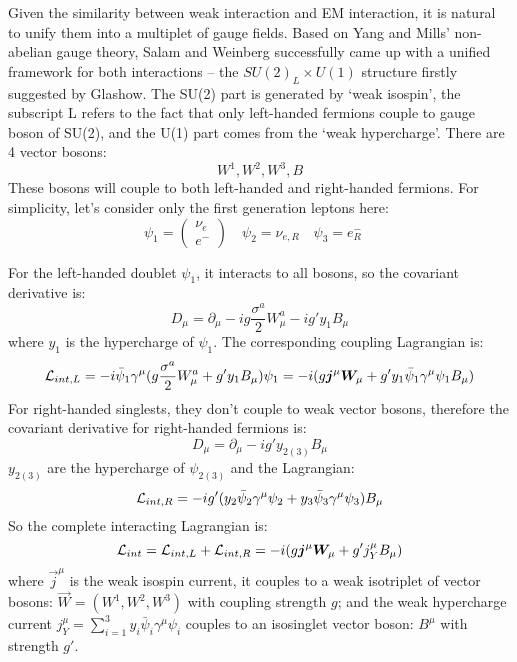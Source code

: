 Given the similarity between weak interaction and EM interaction, it is natural
to unify them into a multiplet of gauge fields. Based on Yang and Mills' non-abelian 
gauge theory, Salam and Weinberg successfully came up with a unified 
framework for both interactions -- the $SU(2)_L \times U(1)$ structure firstly suggested 
by Glashow. The SU(2) part is generated by `weak isospin', the subscript L refers
to the fact that only left-handed fermions couple to gauge boson of SU(2), and the U(1)
part comes from the `weak hypercharge'. There are 4 vector bosons:
$$ W^1, W^2, W^3, B $$
These bosons will couple to both left-handed and right-handed fermions. For simplicity,
let's consider only the first generation leptons here:
\begin{equation}
    \psi_1 = \begin{pmatrix} \nu_e \\ e^-  \end{pmatrix}	\quad
    \psi_2 = \nu_{e,R}	\quad
    \psi_3 = e^-_R    \quad
\end{equation}

For the left-handed doublet $\psi_1$, it interacts to all bosons, 
so the covariant derivative is:
\begin{equation}
    D_\mu = \partial_\mu - ig\frac{\sigma^a}{2}W_\mu^a - ig'y_1B_\mu
\end{equation}
where $y_1$ is the hypercharge of $\psi_1$.
The corresponding coupling Lagrangian is:
\begin{equation}
    \mathcal{L}_{int, L} = -i\bar{\psi}_1 \gamma^\mu (g\frac{\sigma^a}{2}W^a_\mu + g'y_1B_\mu) \psi_1
	= -i(g\boldsymbol{j}^\mu\boldsymbol{W}_\mu + g'y_1\bar{\psi}_1\gamma^\mu\psi_1 B_\mu)
\end{equation}
For right-handed singlests, they don't couple to weak vector bosons, 
therefore the covariant derivative for right-handed fermions is:
\begin{equation}
    D_\mu = \partial_\mu - ig'y_{2(3)}B_\mu
\end{equation}
$y_{2(3)}$ are the hypercharge of $\psi_{2(3)}$
and the Lagrangian:
\begin{equation}
    \mathcal{L}_{int, R} = -ig'(y_2\bar{\psi}_2 \gamma^\mu \psi_2 + y_3\bar{\psi}_3\gamma^\mu \psi_3) B_\mu
\end{equation}
So the complete interacting Lagrangian is:
\begin{equation}
    \mathcal{L}_{int} = \mathcal{L}_{int, L} + \mathcal{L}_{int, R} = -i(g\boldsymbol{j}^\mu \boldsymbol{W}_\mu + g'j^\mu_{Y} B_\mu)
    \label{eq:GSW}
\end{equation}
where $\vec{j}^\mu$ is the weak isospin current, it couples to a weak 
isotriplet of vector bosons: $\vec{W} = (W^1, W^2, W^3)$ with
coupling strength $g$; and the weak hypercharge current 
$j^\mu_{Y} = \sum_{i=1}^3 y_i\bar{\psi}_i\gamma^\mu\psi_i$ couples to 
an isosinglet vector boson: $B^\mu$ with strength $g'$. 

